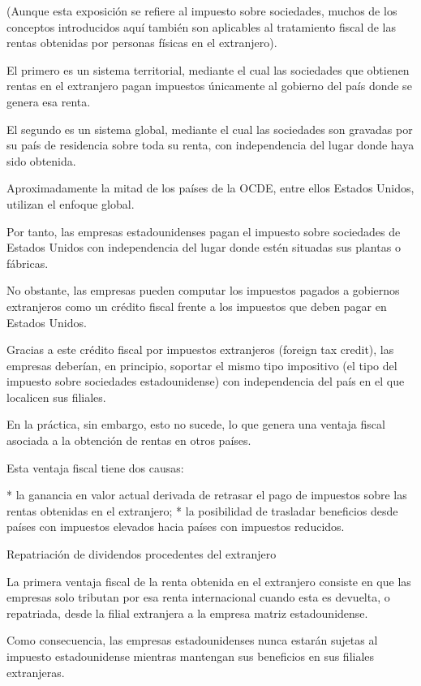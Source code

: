 \documentclass[10pt,a4paper]{article}
\begin{document}
(Aunque esta exposición se refiere al impuesto sobre sociedades, muchos de los conceptos introducidos aquí también son aplicables al tratamiento fiscal de las rentas obtenidas por personas físicas en el extranjero).

El primero es un sistema territorial, mediante el cual las sociedades que obtienen rentas en el extranjero pagan impuestos únicamente al gobierno del país donde se genera esa renta.

El segundo es un sistema global, mediante el cual las sociedades son gravadas por su país de residencia sobre toda su renta, con independencia del lugar donde haya sido obtenida.

Aproximadamente la mitad de los países de la OCDE, entre ellos Estados Unidos, utilizan el enfoque global.

Por tanto, las empresas estadounidenses pagan el impuesto sobre sociedades de Estados Unidos con independencia del lugar donde estén situadas sus plantas o fábricas.

No obstante, las empresas pueden computar los impuestos pagados a gobiernos extranjeros como un crédito fiscal frente a los impuestos que deben pagar en Estados Unidos.

Gracias a este crédito fiscal por impuestos extranjeros (foreign tax credit), las empresas deberían, en principio, soportar el mismo tipo impositivo (el tipo del impuesto sobre sociedades estadounidense) con independencia del país en el que localicen sus filiales.

En la práctica, sin embargo, esto no sucede, lo que genera una ventaja fiscal asociada a la obtención de rentas en otros países.

Esta ventaja fiscal tiene dos causas:

* la ganancia en valor actual derivada de retrasar el pago de impuestos sobre las rentas obtenidas en el extranjero;
* la posibilidad de trasladar beneficios desde países con impuestos elevados hacia países con impuestos reducidos.

Repatriación de dividendos procedentes del extranjero

La primera ventaja fiscal de la renta obtenida en el extranjero consiste en que las empresas solo tributan por esa renta internacional cuando esta es devuelta, o repatriada, desde la filial extranjera a la empresa matriz estadounidense.

Como consecuencia, las empresas estadounidenses nunca estarán sujetas al impuesto estadounidense mientras mantengan sus beneficios en sus filiales extranjeras.
\end{document}
